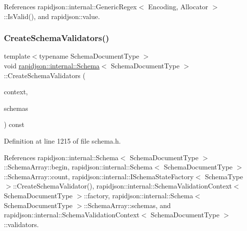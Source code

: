 References rapidjson\+::internal\+::\+Generic\+Regex$<$ Encoding, Allocator $>$\+::\+Is\+Valid(), and rapidjson\+::value.

\mbox{\label{classrapidjson_1_1internal_1_1_schema_ae8b6a84896bc860c0aceaf8101705134}} 
\subsubsection{\texorpdfstring{CreateSchemaValidators()}{CreateSchemaValidators()}}
{\footnotesize\ttfamily template$<$typename Schema\+Document\+Type $>$ \\
void \mbox{\hyperlink{classrapidjson_1_1internal_1_1_schema}{rapidjson\+::internal\+::\+Schema}}$<$ Schema\+Document\+Type $>$\+::Create\+Schema\+Validators (\begin{DoxyParamCaption}\item[{\mbox{\hyperlink{classrapidjson_1_1internal_1_1_schema_afca06b1f51d1bc18403bdf3f4d55ffef}{Context}} \&}]{context,  }\item[{const \mbox{\hyperlink{structrapidjson_1_1internal_1_1_schema_1_1_schema_array}{Schema\+Array}} \&}]{schemas }\end{DoxyParamCaption}) const\hspace{0.3cm}{\ttfamily [private]}}



Definition at line 1215 of file schema.\+h.


\begin{DoxyCode}{0}

\end{DoxyCode}


References rapidjson\+::internal\+::\+Schema$<$ Schema\+Document\+Type $>$\+::\+Schema\+Array\+::begin, rapidjson\+::internal\+::\+Schema$<$ Schema\+Document\+Type $>$\+::\+Schema\+Array\+::count, rapidjson\+::internal\+::\+I\+Schema\+State\+Factory$<$ Schema\+Type $>$\+::\+Create\+Schema\+Validator(), rapidjson\+::internal\+::\+Schema\+Validation\+Context$<$ Schema\+Document\+Type $>$\+::factory, rapidjson\+::internal\+::\+Schema$<$ Schema\+Document\+Type $>$\+::\+Schema\+Array\+::schemas, and rapidjson\+::internal\+::\+Schema\+Validation\+Context$<$ Schema\+Document\+Type $>$\+::validators.

